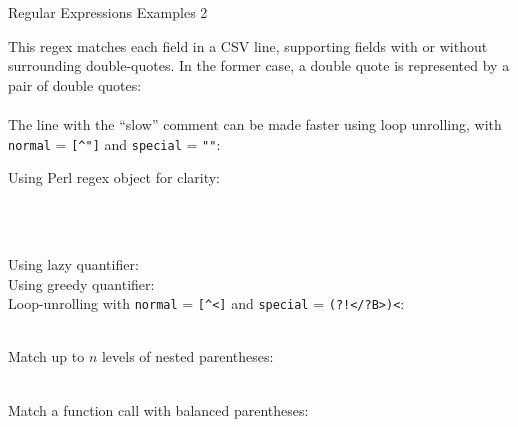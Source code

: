 \documentclass[10pt, a4paper, landscape]{scrartcl}
\newcommand{\regex}[1]{\texttt{#1}}
\newcommand{\cregex}[1]{\colorbox{gray!30}{\regex{#1}}}
\newcommand{\reshortexample}[1]{\cregex{}}
\newcommand{\relongexample}[1]{\regex{}}
\begin{document}
\begin{cheatsheet}{Regular Expressions Examples 2}

\begin{col1}


This regex matches each field in a CSV line, supporting fields with or without
surrounding double-quotes. In the former case, a double quote is represented by
a pair of double quotes:\\
\relongexample{./parse_csv.tex}\\
The line with the ``slow'' comment can be made faster using loop unrolling,
with \regex{normal} = \cregex{[\^{}"]} and \regex{special} = \cregex{""}:
\reshortexample{./parse_csv_lu.tex}\\


Using Perl regex object for clarity:\\
\relongexample{./ip.tex}\\


\relongexample{./email_addr.tex}

\end{col1}

\begin{col2}


\relongexample{./url.tex}\\


Using lazy quantifier:
\reshortexample{./matchclosetag_lazy.tex}\\
Using greedy quantifier:
\reshortexample{./matchclosetag_greedy.tex}\\
Loop-unrolling with
\regex{normal} = \cregex{[\^{}<]} and
\regex{special} = \cregex{(?!</?B>)<}:\\
\relongexample{./matchclosetag_lu.tex}\\

\end{col2}

\begin{col3}


Match up to $n$ levels of nested parentheses:\\
\relongexample{./balanced_paren_static.tex}\\


Match a function call with balanced parentheses:\\
\relongexample{./balanced_paren_dynamic.tex}\\

\end{col3}

\end{cheatsheet}
\end{document}
